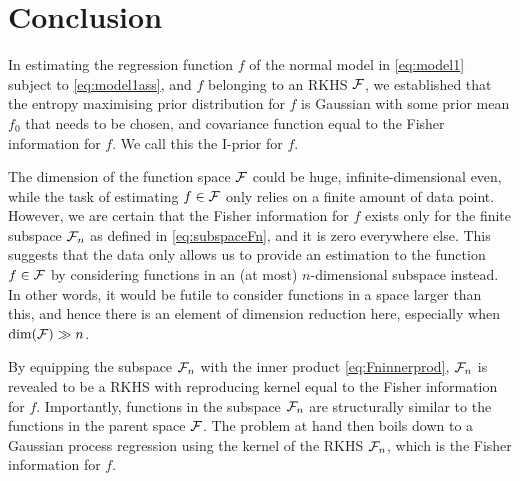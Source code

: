 \documentclass[a4paper,showframe,11pt]{report}
\begin{document}
\section{Conclusion}

In estimating the regression function $f$ of the normal model in \cref{eq:model1} subject to \cref{eq:model1ass}, and $f$ belonging to an RKHS ${\mathcal F}$, we established that the entropy maximising prior distribution for $f$ is Gaussian with some prior mean $f_0$ that needs to be chosen, and covariance function equal to the Fisher information for $f$.
We call this the I-prior for $f$.

The dimension of the function space ${\mathcal F}$ could be huge, infinite-dimensional even, while the task of estimating $f\in{\mathcal F}$ only relies on a finite amount of data point.
However, we are certain that the Fisher information for $f$ exists only for the finite subspace ${\mathcal F}_n$ as defined in \cref{eq:subspaceFn}, and it is zero everywhere else.
This suggests that the data only allows us to provide an estimation to the function $f\in{\mathcal F}$ by considering functions in an (at most) $n$-dimensional subspace instead.
In other words, it would be futile to consider functions in a space larger than this, and hence there is an element of dimension reduction here, especially when $\dim({\mathcal F}) \gg n$.

By equipping the subspace ${\mathcal F}_n$ with the inner product \cref{eq:Fninnerprod}, ${\mathcal F}_n$ is revealed to be a RKHS with reproducing kernel equal to the Fisher information for $f$.
Importantly, functions in the subspace ${\mathcal F}_n$ are structurally similar to the functions in the parent space ${\mathcal F}$.
The problem at hand then boils down to a Gaussian process regression using the kernel of the RKHS ${\mathcal F}_n$, which is the Fisher information for $f$.

%

\hClosingStuffStandalone
\end{document}
